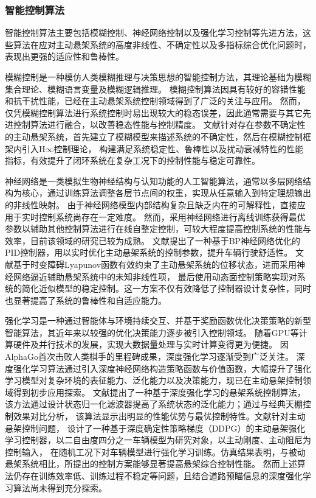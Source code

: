 \subsubsection{智能控制算法}
智能控制算法主要包括模糊控制、神经网络控制以及强化学习控制等先进方法，这些算法在应对主动悬架系统的高度非线性、不确定性以及多指标综合优化问题时，表现出更强的适应性和鲁棒性。

模糊控制是一种模仿人类模糊推理与决策思想的智能控制方法，其理论基础为模糊集合理论、模糊语言变量及模糊逻辑推理。
模糊控制算法因具有较好的容错性能和抗干扰性能，已经在主动悬架系统控制领域得到了广泛的关注与应用。
然而，仅凭模糊控制算法进行系统控制时易出现较大的稳态误差，因此通常需要与其它先进控制算法进行融合，以改善稳态性能与控制精度\cite{JSYZ202505014}。
文献针对存在参数不确定性的主动悬架系统，首先建立了模糊模型来描述系统的不确定性，然后在模糊控制框架内引入H$\infty$控制理论，
构建满足系统稳定性、鲁棒性以及扰动衰减特性的性能指标，有效提升了闭环系统在复杂工况下的控制性能与稳定可靠性。

神经网络是一类模拟生物神经结构与认知功能的人工智能算法，通常以多层网络结构为核心，通过训练算法调整各层节点间的权重，实现从任意输入到特定理想输出的非线性映射。
由于神经网络模型内部结构复杂且缺乏内在的可解释性，直接应用于实时控制系统尚存在一定难度。
然而，采用神经网络进行离线训练获得最优参数以辅助其他控制算法进行在线自整定控制，可较大程度提高控制系统的性能与效率，目前该领域的研究已较为成熟。
文献提出了一种基于BP神经网络优化的PID控制器，用以实时优化主动悬架系统的控制参数，提升车辆行驶舒适性。
文献基于时变障碍Lyapunov函数有效约束了主动悬架系统的位移状态，进而采用神经网络逼近辅助悬架系统中的未知非线性项，	
最后使用动态面控制策略实现对系统的简化近似模型的稳定控制。这一方案不仅有效降低了控制器设计复杂性，同时也显著提高了系统的鲁棒性和自适应能力。

强化学习是一种通过智能体与环境持续交互、并基于奖励函数优化决策策略的新型智能算法，其近年来以较强的优化决策能力逐步被引入控制领域。
随着GPU等计算硬件及并行技术的发展，实现大数据量处理与实时计算变得更为便捷。
因AlphaGo首次击败人类棋手的里程碑成果，深度强化学习逐渐受到广泛关注。
深度强化学习算法通过引入深度神经网络构造策略函数与价值函数，大幅提升了强化学习模型对复杂环境的表征能力、泛化能力以及决策能力，现已在主动悬架控制领域得到初步应用探索。
文献提出了一种基于深度强化学习的悬架系统控制算法，该方法通过设计状态归一化滤波器提高了系统状态的泛化能力；通过与经典天棚控制效果对比分析，
该算法显示出明显的性能优势与最优控制特性。文献针对主动悬架控制问题，
设计了一种基于深度确定性策略梯度（DDPG）的主动悬架强化学习控制器，以二自由度四分之一车辆模型为研究对象，以主动刚度、主动阻尼为控制输入，
在随机工况下对车辆模型进行强化学习训练。仿真结果表明，与被动悬架系统相比，所提出的控制方案能够显著提高悬架综合控制性能。
然而上述算法仍存在训练效率低、训练过程不稳定等问题，且结合道路预瞄信息的深度强化学习算法尚未得到充分探索。

